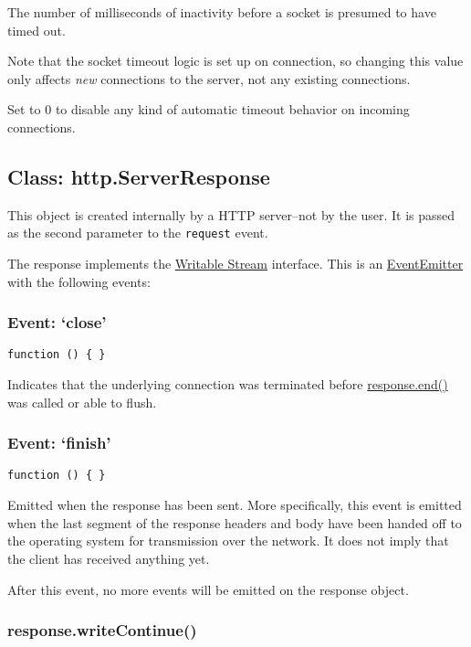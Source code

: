 The number of milliseconds of inactivity before a socket is presumed to
have timed out.

Note that the socket timeout logic is set up on connection, so changing
this value only affects \emph{new} connections to the server, not any
existing connections.

Set to 0 to disable any kind of automatic timeout behavior on incoming
connections.

\subsection{Class: http.ServerResponse}\label{class-http.serverresponse}

This object is created internally by a HTTP server--not by the user. It
is passed as the second parameter to the
\texttt{\textquotesingle{}request\textquotesingle{}} event.

The response implements the
\href{stream.html\#stream_class_stream_writable}{Writable Stream}
interface. This is an
\href{events.html\#events_class_events_eventemitter}{EventEmitter} with
the following events:

\subsubsection{\texorpdfstring{Event:
`close'}{Event: close}}\label{event-close-1}

\texttt{function\ ()\ \{\ \}}

Indicates that the underlying connection was terminated before
\hyperref[httpux5fresponseux5fendux5fdataux5fencoding]{response.end()}
was called or able to flush.

\subsubsection{\texorpdfstring{Event:
`finish'}{Event: finish}}\label{event-finish}

\texttt{function\ ()\ \{\ \}}

Emitted when the response has been sent. More specifically, this event
is emitted when the last segment of the response headers and body have
been handed off to the operating system for transmission over the
network. It does not imply that the client has received anything yet.

After this event, no more events will be emitted on the response object.

\subsubsection{response.writeContinue()}\label{response.writecontinue}

